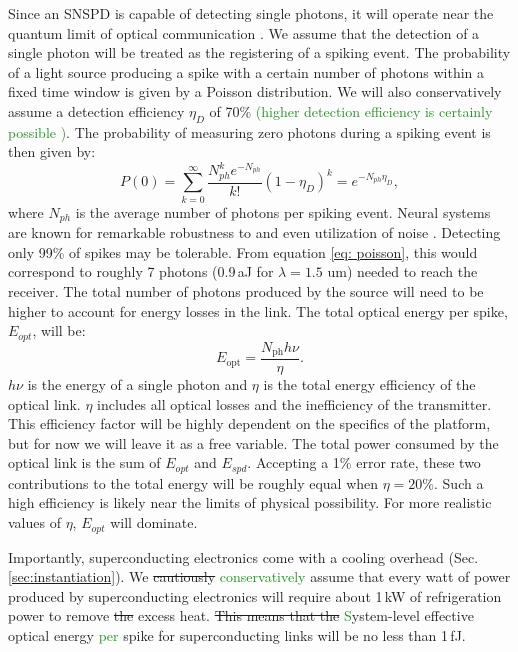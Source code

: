 \documentclass[twocolumn]{article}
\begin{document}
Since an SNSPD is capable of detecting single photons, it will operate near the quantum limit of optical communication \cite{razavi2012design}. We assume that the detection of a single photon will be treated as the registering of a spiking event. The probability of a light source producing a spike with a certain number of photons within a fixed time window is given by a Poisson distribution. We will also conservatively assume a detection efficiency $\eta_D$ of 70\%\textcolor{ForestGreen}{ (higher detection efficiency is certainly possible \cite{mave2013,rene2020})}. The probability of measuring zero photons during a spiking event is then given by:
\begin{equation}
    P(0) = \sum_{k=0}^{\infty} \frac{N_{ph}^k e^{-N_{ph}}}{k!}(1-\eta_D)^{k} = e^{-N_{ph}\eta_D},
\label{eq: poisson}
\end{equation}
where $N_{ph}$ is the average number of photons per spiking event. Neural systems are known for remarkable robustness to and even utilization of noise \cite{stein2005neuronal, mcdonnell2011benefits}. Detecting only 99\% of spikes may be tolerable. From equation \ref{eq: poisson}, this would correspond to roughly 7 photons (0.9\,aJ for $\lambda = 1.5$ um) needed to reach the receiver. The total number of photons produced by the source will need to be higher to account for energy losses in the link. The total optical energy per spike, $E_{opt}$, will be:
\begin{equation}
    E_{\mathrm{opt}} = \frac{N_{\mathrm{ph}} h \nu}{\eta}.
\end{equation}
$h\nu$ is the energy of a single photon and $\eta$ is the total energy efficiency of the optical link. $\eta$ includes all optical losses and the inefficiency of the transmitter. This efficiency factor will be highly dependent on the specifics of the platform, but for now we will leave it as a free variable. The total power consumed by the optical link is the sum of $E_{opt}$ and $E_{spd}$. Accepting a 1\% error rate, these two contributions to the total energy will be roughly equal when $\eta = 20\%$. Such a high efficiency is likely near the limits of physical possibility. For more realistic values of $\eta$, $E_{opt}$ will dominate.

Importantly, superconducting electronics come with a cooling overhead (Sec.\,\ref{sec:instantiation}). We \sout{cautiously} \textcolor{ForestGreen}{conservatively} assume that every watt of power produced by superconducting electronics will require about 1\,kW of refrigeration power to remove \sout{the} excess heat. \sout{This means that the} \textcolor{ForestGreen}{S}ystem-level effective optical energy \textcolor{ForestGreen}{per} spike for superconducting links will be no less than 1\,fJ.
\end{document}
